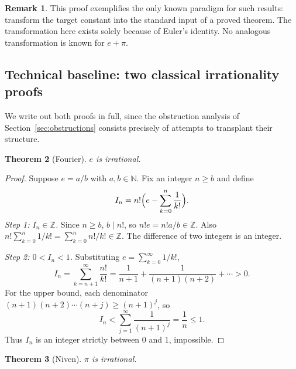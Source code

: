 \documentclass[11pt]{amsart}
\newtheorem{theorem}{Theorem}[section]
\theoremstyle{definition}
\newtheorem{remark}[theorem]{Remark}
\theoremstyle{remark}
\numberwithin{equation}{section}
\newcommand{\Z}{\mathbb{Z}}
\newcommand{\N}{\mathbb{N}}
\newcommand{\ee}{e}
\begin{document}
\begin{remark}
This proof exemplifies the only known paradigm for such results: transform the target constant into the standard input of a proved theorem. The transformation here exists solely because of Euler's identity. No analogous transformation is known for $e+\pi$.
\end{remark}

\subsection{Technical baseline: two classical irrationality proofs}

We write out both proofs in full, since the obstruction analysis of Section~\ref{sec:obstructions} consists precisely of attempts to transplant their structure.

\begin{theorem}[Fourier]\label{thm:fourier}
$\ee$ is irrational.
\end{theorem}

\begin{proof}
Suppose $\ee=a/b$ with $a,b\in\N$. Fix an integer $n\ge b$ and define
\[
I_n=n!\Bigl(\ee-\sum_{k=0}^{n}\frac{1}{k!}\Bigr).
\]
\emph{Step 1: $I_n\in\Z$.} Since $n\ge b$, $b\mid n!$, so $n!\ee=n!a/b\in\Z$. Also $n!\sum_{k=0}^n 1/k!=\sum_{k=0}^n n!/k!\in\Z$. The difference of two integers is an integer.

\emph{Step 2: $0<I_n<1$.} Substituting $\ee=\sum_{k=0}^\infty 1/k!$,
\[
I_n=\sum_{k=n+1}^{\infty}\frac{n!}{k!}=\frac{1}{n+1}+\frac{1}{(n+1)(n+2)}+\cdots>0.
\]
For the upper bound, each denominator $(n+1)(n+2)\cdots(n+j)\ge(n+1)^j$, so
\[
I_n<\sum_{j=1}^{\infty}\frac{1}{(n+1)^j}=\frac{1}{n}\le 1.
\]
Thus $I_n$ is an integer strictly between $0$ and $1$, impossible.
\end{proof}

\begin{theorem}[Niven]\label{thm:niven}
$\pi$ is irrational.
\end{theorem}
\end{document}
